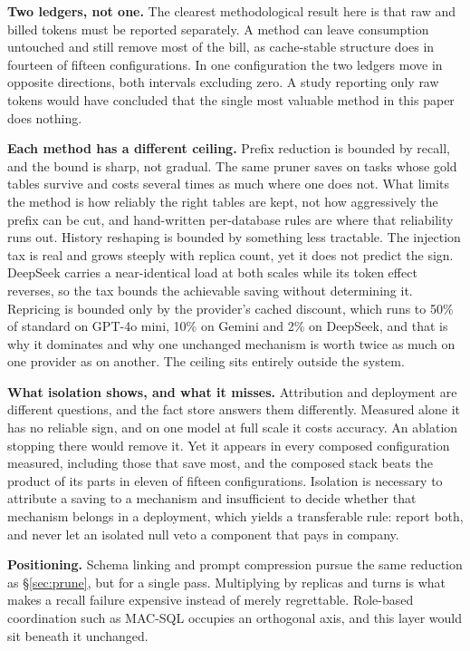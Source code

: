 \documentclass[conference]{IEEEtran}
\begin{document}
\textbf{Two ledgers, not one.} The clearest methodological result here is that
raw and billed tokens must be reported separately. A method can leave
consumption untouched and still remove most of the bill, as cache-stable
structure does in fourteen of fifteen configurations. In one configuration the
two ledgers move in opposite directions, both intervals excluding zero.
A study reporting only raw tokens would have concluded that the single most
valuable method in this paper does nothing.

\textbf{Each method has a different ceiling.} Prefix reduction is bounded
by recall, and the bound is sharp, not gradual. The same pruner saves on tasks
whose gold tables survive and costs several times as much where one does not.
What limits the method is how reliably the right tables are kept, not how
aggressively the prefix can be cut, and hand-written per-database rules are
where that reliability runs out. History reshaping is bounded by something less
tractable. The injection tax is real and grows steeply with replica count, yet
it does not predict the sign. DeepSeek carries a near-identical load at both
scales while its token effect reverses, so the tax bounds the achievable saving
without determining it. Repricing is bounded only by the provider's cached
discount, which runs to 50\% of standard on GPT-4o mini, 10\% on Gemini and 2\%
on DeepSeek, and that is why it dominates and why one unchanged mechanism is
worth twice as much on one provider as on another. The ceiling sits entirely outside the
system.

\textbf{What isolation shows, and what it misses.} Attribution and deployment
are different questions, and the fact store answers them differently. Measured alone it has
no reliable sign, and on one model at full scale it costs accuracy. An ablation stopping
there would remove it. Yet it appears in every composed configuration measured,
including those that save most, and the composed stack beats the
product of its parts in eleven of fifteen configurations. Isolation is necessary to attribute a saving to a mechanism and insufficient to
decide whether that mechanism belongs in a deployment, which yields a
transferable rule: report both, and never let an isolated null veto a component
that pays in company.

\textbf{Positioning.} Schema linking and prompt compression pursue the same
reduction as §\ref{sec:prune}, but for a single pass. Multiplying by replicas
and turns is what makes a recall failure expensive instead of merely
regrettable. Role-based coordination such as MAC-SQL occupies an orthogonal
axis, and this layer would sit beneath it unchanged.
\end{document}
